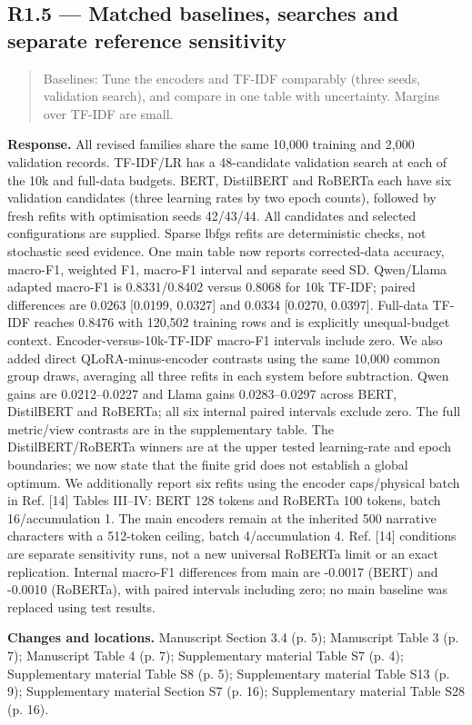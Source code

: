 \documentclass[11pt,a4paper]{article}
\begin{document}
\subsection*{R1.5 — Matched baselines, searches and separate reference sensitivity}
\begin{quote}\small Baselines: Tune the encoders and TF-IDF comparably (three seeds, validation search), and compare in one table with uncertainty. Margins over TF-IDF are small.\end{quote}
\textbf{Response.} All revised families share the same 10,000 training and 2,000 validation records. TF-IDF/LR has a 48-candidate validation search at each of the 10k and full-data budgets. BERT, DistilBERT and RoBERTa each have six validation candidates (three learning rates by two epoch counts), followed by fresh refits with optimisation seeds 42/43/44. All candidates and selected configurations are supplied. Sparse lbfgs refits are deterministic checks, not stochastic seed evidence. One main table now reports corrected-data accuracy, macro-F1, weighted F1, macro-F1 interval and separate seed SD. Qwen/Llama adapted macro-F1 is 0.8331/0.8402 versus 0.8068 for 10k TF-IDF; paired differences are 0.0263 [0.0199, 0.0327] and 0.0334 [0.0270, 0.0397]. Full-data TF-IDF reaches 0.8476 with 120,502 training rows and is explicitly unequal-budget context. Encoder-versus-10k-TF-IDF macro-F1 intervals include zero. We also added direct QLoRA-minus-encoder contrasts using the same 10,000 common group draws, averaging all three refits in each system before subtraction. Qwen gains are 0.0212--0.0227 and Llama gains 0.0283--0.0297 across BERT, DistilBERT and RoBERTa; all six internal paired intervals exclude zero. The full metric/view contrasts are in the supplementary table. The DistilBERT/RoBERTa winners are at the upper tested learning-rate and epoch boundaries; we now state that the finite grid does not establish a global optimum. We additionally report six refits using the encoder caps/physical batch in Ref. [14] Tables III–IV: BERT 128 tokens and RoBERTa 100 tokens, batch 16/accumulation 1. The main encoders remain at the inherited 500 narrative characters with a 512-token ceiling, batch 4/accumulation 4. Ref. [14] conditions are separate sensitivity runs, not a new universal RoBERTa limit or an exact replication. Internal macro-F1 differences from main are -0.0017 (BERT) and -0.0010 (RoBERTa), with paired intervals including zero; no main baseline was replaced using test results.

\textbf{Changes and locations.} Manuscript Section 3.4 (p. 5); Manuscript Table 3 (p. 7); Manuscript Table 4 (p. 7); Supplementary material Table S7 (p. 4); Supplementary material Table S8 (p. 5); Supplementary material Table S13 (p. 9); Supplementary material Section S7 (p. 16); Supplementary material Table S28 (p. 16).
\end{document}
